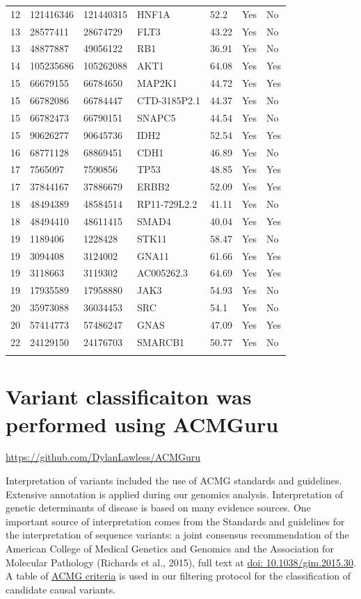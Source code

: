 \documentclass{article}
\begin{document}
\begin{center}
\begin{longtable}{ l l l l l l l}
12 & 121416346 & 121440315 & HNF1A & 52.2 & Yes & No \\
13 & 28577411 & 28674729 & FLT3 & 43.22 & Yes & No \\
13 & 48877887 & 49056122 & RB1 & 36.91 & Yes & No \\
14 & 105235686 & 105262088 & AKT1 & 64.08 & Yes & Yes \\
15 & 66679155 & 66784650 & MAP2K1 & 44.72 & Yes & Yes \\
15 & 66782086 & 66784447 & CTD-3185P2.1 & 44.37 & Yes & No \\
15 & 66782473 & 66790151 & SNAPC5 & 44.54 & Yes & No \\
15 & 90626277 & 90645736 & IDH2 & 52.54 & Yes & Yes \\
16 & 68771128 & 68869451 & CDH1 & 46.89 & Yes & No \\
17 & 7565097 & 7590856 & TP53 & 48.85 & Yes & Yes \\
17 & 37844167 & 37886679 & ERBB2 & 52.09 & Yes & Yes \\
18 & 48494389 & 48584514 & RP11-729L2.2 & 41.11 & Yes & No \\
18 & 48494410 & 48611415 & SMAD4 & 40.04 & Yes & Yes \\
19 & 1189406 & 1228428 & STK11 & 58.47 & Yes & No \\
19 & 3094408 & 3124002 & GNA11 & 61.66 & Yes & Yes \\
19 & 3118663 & 3119302 & AC005262.3 & 64.69 & Yes & Yes \\
19 & 17935589 & 17958880 & JAK3 & 54.93 & Yes & No \\
20 & 35973088 & 36034453 & SRC & 54.1 & Yes & No \\
20 & 57414773 & 57486247 & GNAS & 47.09 & Yes & Yes \\
22 & 24129150 & 24176703 & SMARCB1 & 50.77 & Yes & No \\
\hline
\label{table:2}
\end{longtable}
\end{center}



\section{Variant classificaiton was performed using ACMGuru}
\url{https://github.com/DylanLawless/ACMGuru}

Interpretation of variants included the use of ACMG standards and guidelines. 
Extensive annotation is applied during our genomics analysis. Interpretation of genetic determinants of disease is based on many evidence sources. 
One important source of interpretation comes from the Standards and guidelines for the interpretation of sequence variants: a joint consensus recommendation of the American College of Medical Genetics and Genomics and the Association for Molecular Pathology (Richards et al., 2015), full text at 
\href{https://www.gimjournal.org/article/S1098-3600(21)03031-8/fulltext}{doi: 10.1038/gim.2015.30}.
A table of \href{https://lawlessgenomics.com/topic/acgm-criteria-table-main}{ACMG criteria} is used in our filtering protocol for the classification of candidate causal variants.
\end{document}
